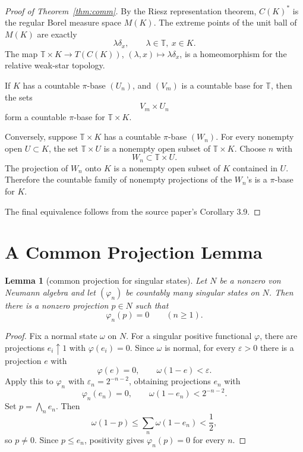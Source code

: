 \documentclass[11pt]{article}
\newtheorem{lemma}{Lemma}
\newcommand{\T}{\mathbb T}
\begin{document}
\begin{proof}[Proof of Theorem~\ref{thm:comm}]
By the Riesz representation theorem, \(C(K)^*\) is the regular Borel measure
space \(M(K)\).  The extreme points of the unit ball of \(M(K)\) are exactly
\[
        \lambda\delta_x,\qquad \lambda\in\T,\ x\in K .
\]
The map \(\T\times K\to T(C(K))\), \((\lambda,x)\mapsto\lambda\delta_x\), is
a homeomorphism for the relative weak-star topology.

If \(K\) has a countable \(\pi\)-base \((U_n)\), and \((V_m)\) is a countable
base for \(\T\), then the sets
\[
        V_m\times U_n
\]
form a countable \(\pi\)-base for \(\T\times K\).

Conversely, suppose \(\T\times K\) has a countable \(\pi\)-base
\((W_n)\).  For every nonempty open \(U\subset K\), the set \(\T\times U\)
is a nonempty open subset of \(\T\times K\).  Choose \(n\) with
\[
        W_n\subset \T\times U .
\]
The projection of \(W_n\) onto \(K\) is a nonempty open subset of \(K\)
contained in \(U\).  Therefore the countable family of nonempty projections
of the \(W_n\)'s is a \(\pi\)-base for \(K\).

The final equivalence follows from the source paper's Corollary 3.9.
\end{proof}

\section*{A Common Projection Lemma}

\begin{lemma}[common projection for singular states]
\label{lem:common}
Let \(N\) be a nonzero von Neumann algebra and let
\((\varphi_n)\) be countably many singular states on \(N\).  Then there is a
nonzero projection \(p\in N\) such that
\[
        \varphi_n(p)=0\qquad(n\ge1).
\]
\end{lemma}

\begin{proof}
Fix a normal state \(\omega\) on \(N\).  For a singular positive functional
\(\varphi\), there are projections \(e_i\uparrow1\) with
\(\varphi(e_i)=0\).  Since \(\omega\) is normal, for every \(\varepsilon>0\)
there is a projection \(e\) with
\[
        \varphi(e)=0,\qquad \omega(1-e)<\varepsilon .
\]
Apply this to \(\varphi_n\) with \(\varepsilon_n=2^{-n-2}\), obtaining
projections \(e_n\) with
\[
        \varphi_n(e_n)=0,\qquad \omega(1-e_n)<2^{-n-2}.
\]
Set \(p=\bigwedge_n e_n\).  Then
\[
        \omega(1-p)
        \le
        \sum_n \omega(1-e_n)
        <\frac12,
\]
so \(p\ne0\).  Since \(p\le e_n\), positivity gives
\(\varphi_n(p)=0\) for every \(n\).
\end{proof}
\end{document}

